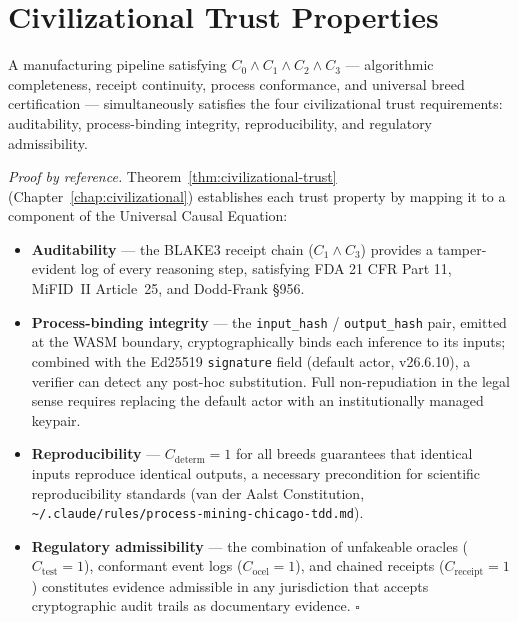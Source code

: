 \section{Civilizational Trust Properties}
\label{sec:thm-civ}

\begin{theorem}
\label{thm:main-civ}
A manufacturing pipeline satisfying $C_0 \wedge C_1 \wedge C_2 \wedge C_3$ — algorithmic
completeness, receipt continuity, process conformance, and universal breed certification
— simultaneously satisfies the four civilizational trust requirements: auditability,
process-binding integrity, reproducibility, and regulatory admissibility.
\end{theorem}

\noindent\textit{Proof by reference.} Theorem~\ref{thm:civilizational-trust}
(Chapter~\ref{chap:civilizational}) establishes each trust property by mapping it to a
component of the Universal Causal Equation:
\begin{itemize}
  \item \textbf{Auditability} — the BLAKE3 receipt chain ($C_1 \wedge C_3$) provides a
        tamper-evident log of every reasoning step, satisfying FDA 21 CFR Part 11,
        MiFID~II Article~25, and Dodd-Frank \S{}956.
  \item \textbf{Process-binding integrity} — the \texttt{input\_hash} /
        \texttt{output\_hash} pair, emitted at the WASM boundary, cryptographically binds
        each inference to its inputs; combined with the Ed25519 \texttt{signature} field
        (default actor, v26.6.10), a verifier can detect any post-hoc substitution.
        Full non-repudiation in the legal sense requires replacing the default actor with
        an institutionally managed keypair.
  \item \textbf{Reproducibility} — $C_{\mathrm{determ}} = 1$ for all breeds guarantees
        that identical inputs reproduce identical outputs, a necessary precondition for
        scientific reproducibility standards (van der Aalst Constitution,
        \texttt{\textasciitilde/.claude/rules/process-mining-chicago-tdd.md}).
  \item \textbf{Regulatory admissibility} — the combination of unfakeable oracles
        ($C_{\mathrm{test}} = 1$), conformant event logs ($C_{\mathrm{ocel}} = 1$), and
        chained receipts ($C_{\mathrm{receipt}} = 1$) constitutes evidence admissible
        in any jurisdiction that accepts cryptographic audit trails as documentary
        evidence. $\square$
\end{itemize}

